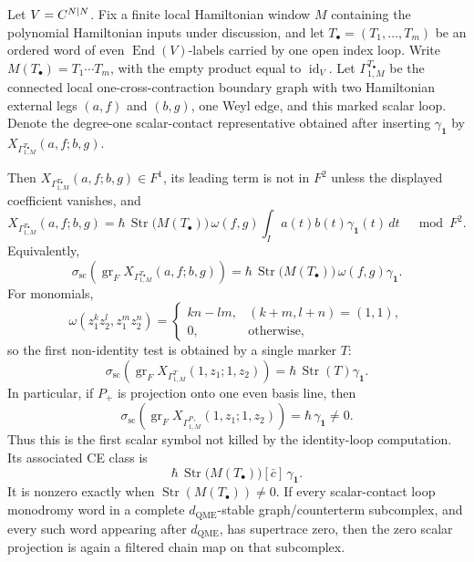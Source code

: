 \begin{prop}
\label{prop:app-first-nonidentity-loop-scalar-symbol}
  Let \(V=C^{N|N}\).  Fix a finite local Hamiltonian window \(M\)
  containing the polynomial Hamiltonian inputs under discussion, and let
  \(T_\bullet=(T_1,\ldots,T_m)\) be an ordered word of even
  \(\operatorname{End}(V)\)-labels carried by one open index loop.  Write
  \(M(T_\bullet)=T_1\cdots T_m\), with the empty product equal to
  \(\operatorname{id}_V\).  Let
  \(\Gamma^{T_\bullet}_{1,M}\) be the connected local
  one-cross-contraction boundary graph with two Hamiltonian external legs
  \((a,f)\) and \((b,g)\), one Weyl edge, and this marked scalar loop.
  Denote the degree-one scalar-contact representative obtained after
  inserting \(\gamma_{\mathbf 1}\) by
  \(X_{\Gamma^{T_\bullet}_{1,M}}(a,f;b,g)\).

  Then
  \(X_{\Gamma^{T_\bullet}_{1,M}}(a,f;b,g)\in F^1\), its leading term is
  not in \(F^2\) unless the displayed coefficient vanishes, and
  \[
    X_{\Gamma^{T_\bullet}_{1,M}}(a,f;b,g)
      =
    \hbar\,\operatorname{Str}\!\bigl(M(T_\bullet)\bigr)\,
    \omega(f,g)\int_Ia(t)b(t)\gamma_{\mathbf 1}(t)\,dt
      \quad\bmod F^2 .
  \]
  Equivalently,
  \[
    \sigma_{\mathrm{sc}}\!\left(
      \operatorname{gr}_{F}
        X_{\Gamma^{T_\bullet}_{1,M}}(a,f;b,g)\right)
      =
    \hbar\,\operatorname{Str}\!\bigl(M(T_\bullet)\bigr)\,
    \omega(f,g)\gamma_{\mathbf 1}.
  \]
  For monomials,
  \[
    \omega(z_1^kz_2^l,z_1^mz_2^n)=
    \begin{cases}
      kn-lm,&(k+m,l+n)=(1,1),\\
      0,&\text{otherwise,}
    \end{cases}
  \]
  so the first non-identity test is obtained by a single marker \(T\):
  \[
    \sigma_{\mathrm{sc}}\!\left(
      \operatorname{gr}_{F}X_{\Gamma^{T}_{1,M}}(1,z_1;1,z_2)\right)
      =
    \hbar\,\operatorname{Str}(T)\gamma_{\mathbf 1}.
  \]
  In particular, if \(P_+\) is projection onto one even basis line, then
  \[
    \sigma_{\mathrm{sc}}\!\left(
      \operatorname{gr}_{F}X_{\Gamma^{P_+}_{1,M}}(1,z_1;1,z_2)\right)
      =
    \hbar\,\gamma_{\mathbf 1}\neq0.
  \]
  Thus this is the first scalar symbol not killed by the identity-loop
  computation.  Its associated CE class is
  \[
    \hbar\,\operatorname{Str}\!\bigl(M(T_\bullet)\bigr)
    [\bar c]\,\gamma_{\mathbf 1}.
  \]
  It is nonzero exactly when
  \(\operatorname{Str}(M(T_\bullet))\neq0\).  If every scalar-contact
  loop monodromy word in a complete \(d_{\mathrm{QME}}\)-stable
  graph/counterterm subcomplex, and every such word appearing after
  \(d_{\mathrm{QME}}\), has supertrace zero, then the zero scalar
  projection is again a filtered chain map on that subcomplex.
\end{prop}

